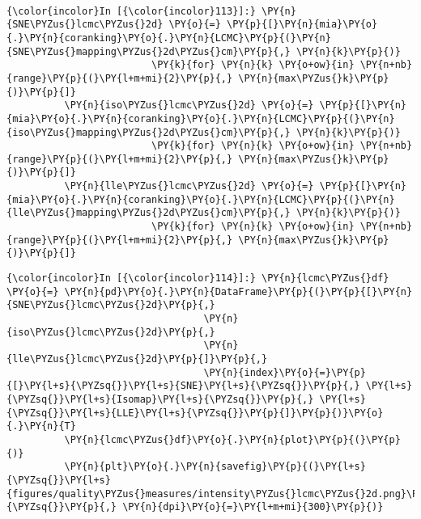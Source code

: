     \begin{center}
    \end{center}
    { \hspace*{\fill} \\}

    \begin{Verbatim}[commandchars=\\\{\}]
{\color{incolor}In [{\color{incolor}113}]:} \PY{n}{SNE\PYZus{}lcmc\PYZus{}2d} \PY{o}{=} \PY{p}{[}\PY{n}{mia}\PY{o}{.}\PY{n}{coranking}\PY{o}{.}\PY{n}{LCMC}\PY{p}{(}\PY{n}{SNE\PYZus{}mapping\PYZus{}2d\PYZus{}cm}\PY{p}{,} \PY{n}{k}\PY{p}{)}
                         \PY{k}{for} \PY{n}{k} \PY{o+ow}{in} \PY{n+nb}{range}\PY{p}{(}\PY{l+m+mi}{2}\PY{p}{,} \PY{n}{max\PYZus{}k}\PY{p}{)}\PY{p}{]}
          \PY{n}{iso\PYZus{}lcmc\PYZus{}2d} \PY{o}{=} \PY{p}{[}\PY{n}{mia}\PY{o}{.}\PY{n}{coranking}\PY{o}{.}\PY{n}{LCMC}\PY{p}{(}\PY{n}{iso\PYZus{}mapping\PYZus{}2d\PYZus{}cm}\PY{p}{,} \PY{n}{k}\PY{p}{)}
                         \PY{k}{for} \PY{n}{k} \PY{o+ow}{in} \PY{n+nb}{range}\PY{p}{(}\PY{l+m+mi}{2}\PY{p}{,} \PY{n}{max\PYZus{}k}\PY{p}{)}\PY{p}{]}
          \PY{n}{lle\PYZus{}lcmc\PYZus{}2d} \PY{o}{=} \PY{p}{[}\PY{n}{mia}\PY{o}{.}\PY{n}{coranking}\PY{o}{.}\PY{n}{LCMC}\PY{p}{(}\PY{n}{lle\PYZus{}mapping\PYZus{}2d\PYZus{}cm}\PY{p}{,} \PY{n}{k}\PY{p}{)}
                         \PY{k}{for} \PY{n}{k} \PY{o+ow}{in} \PY{n+nb}{range}\PY{p}{(}\PY{l+m+mi}{2}\PY{p}{,} \PY{n}{max\PYZus{}k}\PY{p}{)}\PY{p}{]}
\end{Verbatim}

    \begin{Verbatim}[commandchars=\\\{\}]
{\color{incolor}In [{\color{incolor}114}]:} \PY{n}{lcmc\PYZus{}df} \PY{o}{=} \PY{n}{pd}\PY{o}{.}\PY{n}{DataFrame}\PY{p}{(}\PY{p}{[}\PY{n}{SNE\PYZus{}lcmc\PYZus{}2d}\PY{p}{,}
                                  \PY{n}{iso\PYZus{}lcmc\PYZus{}2d}\PY{p}{,}
                                  \PY{n}{lle\PYZus{}lcmc\PYZus{}2d}\PY{p}{]}\PY{p}{,}
                                  \PY{n}{index}\PY{o}{=}\PY{p}{[}\PY{l+s}{\PYZsq{}}\PY{l+s}{SNE}\PY{l+s}{\PYZsq{}}\PY{p}{,} \PY{l+s}{\PYZsq{}}\PY{l+s}{Isomap}\PY{l+s}{\PYZsq{}}\PY{p}{,} \PY{l+s}{\PYZsq{}}\PY{l+s}{LLE}\PY{l+s}{\PYZsq{}}\PY{p}{]}\PY{p}{)}\PY{o}{.}\PY{n}{T}
          \PY{n}{lcmc\PYZus{}df}\PY{o}{.}\PY{n}{plot}\PY{p}{(}\PY{p}{)}
          \PY{n}{plt}\PY{o}{.}\PY{n}{savefig}\PY{p}{(}\PY{l+s}{\PYZsq{}}\PY{l+s}{figures/quality\PYZus{}measures/intensity\PYZus{}lcmc\PYZus{}2d.png}\PY{l+s}{\PYZsq{}}\PY{p}{,} \PY{n}{dpi}\PY{o}{=}\PY{l+m+mi}{300}\PY{p}{)}
\end{Verbatim}


